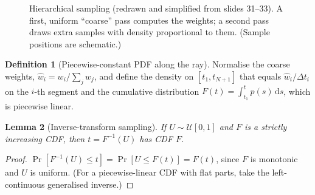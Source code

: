 \documentclass[11pt,a4paper]{article}
\newcommand{\dif}{\,\mathrm{d}}
\newcommand{\x}{{\bm{x}}}
\newcommand{\wi}{{\bm{\omega}_i}}
\theoremstyle{definition}
\newtheorem{definition}{Definition}[section]
\theoremstyle{plain}
\newtheorem{lemma}[definition]{Lemma}
\theoremstyle{remark}
\begin{document}
\begin{figure}[H]
\centering
{}
\caption{Hierarchical sampling (redrawn and simplified from slides 31--33). A first, uniform ``coarse'' pass computes the weights; a second pass draws extra samples with density proportional to them. (Sample positions are schematic.)}
\end{figure}

\begin{definition}[Piecewise-constant PDF along the ray]
Normalise the coarse weights, $\hat w_i=w_i/\sum_jw_j$, and define the density on $[t_1,t_{N+1}]$ that equals $\hat w_i/\Delta t_i$ on the $i$-th segment and the cumulative distribution $F(t)=\int_{t_1}^tp(s)\dif s$, which is piecewise linear.
\end{definition}

\begin{lemma}[Inverse-transform sampling]\label{lem:invcdf}
If $U\sim\mathcal U[0,1]$ and $F$ is a strictly increasing CDF, then $t=F^{-1}(U)$ has CDF $F$.
\end{lemma}
\begin{proof}
$\Pr[F^{-1}(U)\le t]=\Pr[U\le F(t)]=F(t)$, since $F$ is monotonic and $U$ is uniform. (For a piecewise-linear CDF with flat parts, take the left-continuous generalised inverse.)
\end{proof}
\end{document}
